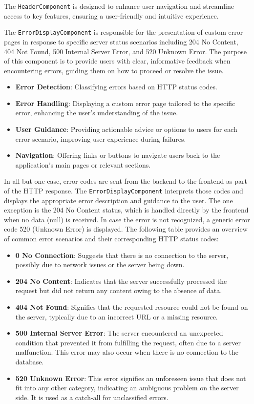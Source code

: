 The \texttt{HeaderComponent} is designed to enhance user navigation and streamline access to key features, ensuring a user-friendly and intuitive experience.


The \texttt{ErrorDisplayComponent} is responsible for the presentation of custom error pages in response to specific server status scenarios including 204 No Content, 404 Not Found, 500 Internal Server Error, and 520 Unknown Error.
The purpose of this component is to provide users with clear, informative feedback when encountering errors, guiding them on how to proceed or resolve the issue.

\begin{itemize}
    \item \textbf{Error Detection}: Classifying errors based on HTTP status codes.
    \item \textbf{Error Handling}: Displaying a custom error page tailored to the specific error, enhancing the user's understanding of the issue.
    \item \textbf{User Guidance}: Providing actionable advice or options to users for each error scenario, improving user experience during failures.
    \item \textbf{Navigation}: Offering links or buttons to navigate users back to the application's main pages or relevant sections.
\end{itemize}

In all but one case, error codes are sent from the backend to the frontend as part of the HTTP response. The \texttt{ErrorDisplayComponent} interprets those codes and displays the appropriate error description and guidance to the user.
The one exception is the 204 No Content status, which is handled directly by the frontend when no data (null) is received. In case the error is not recognized, a generic error code 520 (Unknown Error) is displayed.
The following table provides an overview of common error scenarios and their corresponding HTTP status codes:

\begin{itemize}
    \item \textbf{0 No Connection}: Suggests that there is no connection to the server, possibly due to network issues or the server being down.
    \item \textbf{204 No Content}: Indicates that the server successfully processed the request but did not return any content owing to the absence of data.
    \item \textbf{404 Not Found}: Signifies that the requested resource could not be found on the server, typically due to an incorrect URL or a missing resource.
    \item \textbf{500 Internal Server Error}: The server encountered an unexpected condition that prevented it from fulfilling the request, often due to a server malfunction. This error may also occur when there is no connection to the database.
    \item \textbf{520 Unknown Error}: This error signifies an unforeseen issue that does not fit into any other category, indicating an ambiguous problem on the server side. It is used as a catch-all for unclassified errors.
\end{itemize}
